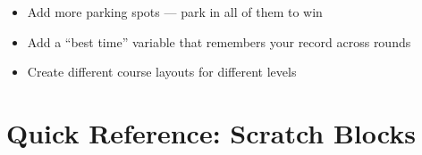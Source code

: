 \documentclass[11pt,a4paper]{article}
\begin{document}
\begin{stretchbox}
\begin{itemize}[nosep]
  \item Add more parking spots --- park in all of them to win
  \item Add a ``best time'' variable that remembers your record across rounds
  \item Create different course layouts for different levels
\end{itemize}
\end{stretchbox}

\newpage

\section*{Quick Reference: Scratch Blocks}
\end{document}
